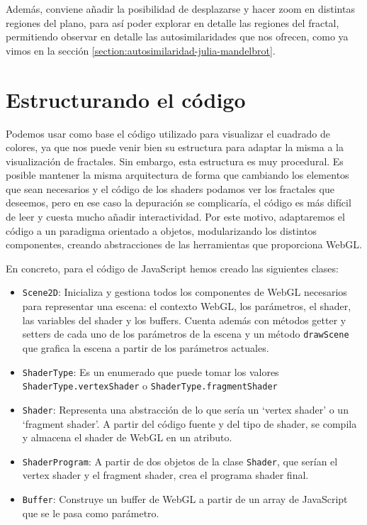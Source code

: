 Además, conviene añadir la posibilidad de desplazarse y hacer zoom en distintas regiones del plano, para así poder explorar en detalle las regiones del fractal, permitiendo observar en detalle las autosimilaridades que nos ofrecen, como ya vimos en la sección \ref{section:autosimilaridad-julia-mandelbrot}. 


\section{Estructurando el código}
\label{section:codigo}

Podemos usar como base el código utilizado para visualizar el cuadrado de colores, ya que nos puede venir bien su estructura para adaptar la misma a la visualización de fractales. Sin embargo, esta estructura es muy procedural. Es posible mantener la misma arquitectura de forma que cambiando los elementos que sean necesarios y el código de los shaders podamos ver los fractales que deseemos, pero en ese caso la depuración se complicaría, el código es más difícil de leer y cuesta mucho añadir interactividad. Por este motivo, adaptaremos el código a un paradigma orientado a objetos, modularizando los distintos componentes, creando abstracciones de las herramientas que proporciona WebGL.

En concreto, para el código de JavaScript hemos creado las siguientes clases:
\begin{itemize}
    \item \verb|Scene2D|: Inicializa y gestiona todos los componentes de WebGL necesarios para representar una escena: el contexto WebGL, los parámetros, el shader, las variables del shader y los buffers. Cuenta además con métodos getter y setters de cada uno de los parámetros de la escena y un método \verb|drawScene| que grafica la escena a partir de los parámetros actuales.
    \item \texttt{ShaderType}: Es un enumerado que puede tomar los valores \texttt{ShaderType.vertexShader} o \texttt{ShaderType.fragmentShader}
    \item \verb|Shader|: Representa una abstracción de lo que sería un `vertex shader' o un `fragment shader'. A partir del código fuente y del tipo de shader, se compila y almacena el shader de WebGL en un atributo.
    \item \verb|ShaderProgram|: A partir de dos objetos de la clase \verb|Shader|, que serían el vertex shader y el fragment shader, crea el programa shader final.
    \item \verb|Buffer|: Construye un buffer de WebGL a partir de un array de JavaScript que se le pasa como parámetro.
\end{itemize}

